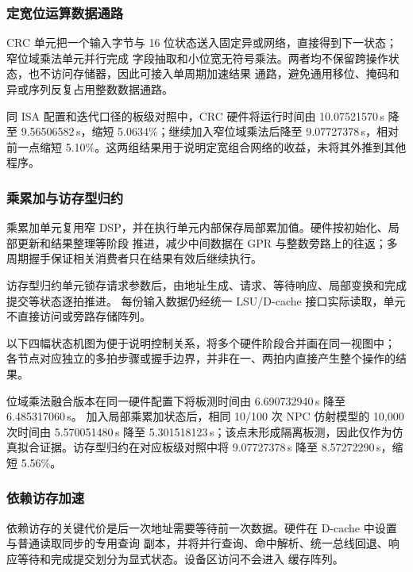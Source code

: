 \subsubsection{定宽位运算数据通路}

CRC 单元把一个输入字节与 16 位状态送入固定异或网络，直接得到下一状态；窄位域乘法单元并行完成
字段抽取和小位宽无符号乘法。两者均不保留跨操作状态，也不访问存储器，因此可接入单周期加速结果
通路，避免通用移位、掩码和异或序列反复占用整数数据通路。



同 ISA 配置和迭代口径的板级对照中，CRC 硬件将运行时间由 10.07521570\,s 降至
9.56506582\,s，缩短 5.0634\%；继续加入窄位域乘法后降至 9.07727378\,s，相对前一点缩短
5.10\%。这两组结果用于说明定宽组合网络的收益，未将其外推到其他程序。

\subsubsection{乘累加与访存型归约}

乘累加单元复用窄 DSP，并在执行单元内部保存局部累加值。硬件按初始化、局部更新和结果整理等阶段
推进，减少中间数据在 GPR 与整数旁路上的往返；多周期握手保证相关消费者只在结果有效后继续执行。

访存型归约单元锁存请求参数后，由地址生成、请求、等待响应、局部变换和完成提交等状态逐拍推进。
每份输入数据仍经统一 LSU/D-cache 接口实际读取，单元不直接访问或旁路存储阵列。

以下四幅状态机图为便于说明控制关系，将多个硬件阶段合并画在同一视图中；
各节点对应独立的多拍步骤或握手边界，并非在一、两拍内直接产生整个操作的结果。



位域乘法融合版本在同一硬件配置下将板测时间由 6.690732940\,s 降至 6.485317060\,s。
加入局部乘累加状态后，相同 10/100 次 NPC 仿射模型的 10,000 次时间由 5.570051480\,s 降至
5.301518123\,s；该点未形成隔离板测，因此仅作为仿真拟合证据。访存型归约在对应板级对照中将
9.07727378\,s 降至 8.57272290\,s，缩短 5.56\%。

\subsubsection{依赖访存加速}

依赖访存的关键代价是后一次地址需要等待前一次数据。硬件在 D-cache 中设置与普通读取同步的专用查询
副本，并将并行查询、命中解析、统一总线回退、响应等待和完成提交划分为显式状态。设备区访问不会进入
缓存阵列。

